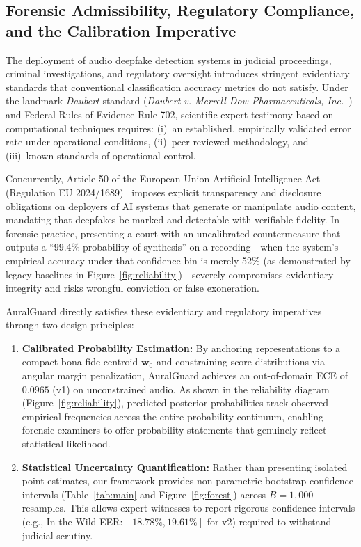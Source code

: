 \subsection{Forensic Admissibility, Regulatory Compliance, and the Calibration Imperative}
\label{ssec:forensic_legal}

The deployment of audio deepfake detection systems in judicial proceedings, criminal investigations, and regulatory oversight introduces stringent evidentiary standards that conventional classification accuracy metrics do not satisfy. Under the landmark \emph{Daubert} standard (\emph{Daubert v. Merrell Dow Pharmaceuticals, Inc.}~\cite{daubert1993}) and Federal Rules of Evidence Rule 702, scientific expert testimony based on computational techniques requires: (i)~an established, empirically validated error rate under operational conditions, (ii)~peer-reviewed methodology, and (iii)~known standards of operational control. 

Concurrently, Article 50 of the European Union Artificial Intelligence Act (Regulation EU 2024/1689)~\cite{eu_ai_act_2024} imposes explicit transparency and disclosure obligations on deployers of AI systems that generate or manipulate audio content, mandating that deepfakes be marked and detectable with verifiable fidelity. In forensic practice, presenting a court with an uncalibrated countermeasure that outputs a ``99.4\% probability of synthesis'' on a recording—when the system's empirical accuracy under that confidence bin is merely 52\% (as demonstrated by legacy baselines in Figure~\ref{fig:reliability})—severely compromises evidentiary integrity and risks wrongful conviction or false exoneration.

AuralGuard directly satisfies these evidentiary and regulatory imperatives through two design principles:
\begin{enumerate}
\item \textbf{Calibrated Probability Estimation:} By anchoring representations to a compact bona fide centroid $\mathbf{w}_0$ and constraining score distributions via angular margin penalization, AuralGuard achieves an out-of-domain ECE of $0.0965$ (v1) on unconstrained audio. As shown in the reliability diagram (Figure~\ref{fig:reliability}), predicted posterior probabilities track observed empirical frequencies across the entire probability continuum, enabling forensic examiners to offer probability statements that genuinely reflect statistical likelihood.
\item \textbf{Statistical Uncertainty Quantification:} Rather than presenting isolated point estimates, our framework provides non-parametric bootstrap confidence intervals (Table~\ref{tab:main} and Figure~\ref{fig:forest}) across $B=1,000$ resamples. This allows expert witnesses to report rigorous confidence intervals (e.g., In-the-Wild EER: $[18.78\%, 19.61\%]$ for v2) required to withstand judicial scrutiny.
\end{enumerate}

